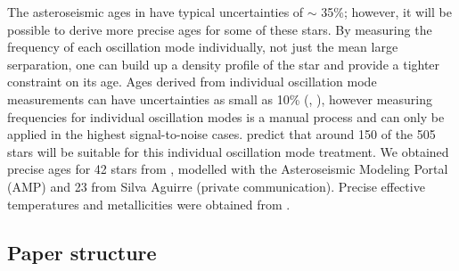 \documentclass[10pt,preprint]{aastex}
\begin{document}
The asteroseismic ages in \citet{Chaplin2013} have typical uncertainties of $\sim$ 35\%; however, it will be possible to derive more precise ages for some of these stars.
By measuring the frequency of each oscillation mode individually, not just the mean large serparation, one can build up a density profile of the star and provide a tighter constraint on its age.
Ages derived from individual oscillation mode measurements can have uncertainties as small as 10\% (\citet{Brown1994}, \citet{SilvaAguirre2013}), however measuring frequencies for individual oscillation modes is a manual process and can only be applied in the highest signal-to-noise cases.
\citet{Chaplin2013} predict that around 150 of the 505 stars will be suitable for this individual oscillation mode treatment.
We obtained precise ages for 42 stars from \citet{Metcalfe2014}, modelled with the Asteroseismic Modeling Portal (AMP) and 23 from Silva Aguirre (private communication).
Precise effective temperatures and metallicities were obtained from \citet{Bruntt2012}.


\subsection{Paper structure}



\end{document}
